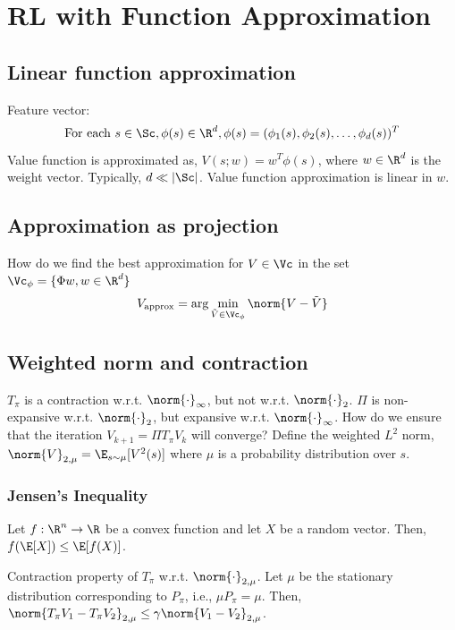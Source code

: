 \chapter{RL with Function Approximation}

\section{Linear function approximation}
Feature vector:
\[
    \text{For each } s \in\Sc, \phi(s) \in \R^d, \phi(s) = (\phi_1(s), \phi_2(s), \dots, \phi_d(s))^T
\]
Value function is approximated as, $V(s; w) = w^T \phi(s)$, where $w \in \R^d$ is the weight vector. Typically, $d \ll |\Sc|$. Value function approximation is linear in $w$.

\section{Approximation as projection}
How do we find the best approximation for $V \in \Vc$ in the set $\Vc_\phi = \{\Phi w, w \in \R^d \}$
\[
    V_{\text{approx}} = \arg\min_{\tilde{V}\in\Vc_\phi} \norm{V - \tilde{V}}
\]
\section{Weighted norm and contraction}
$T_\pi$ is a contraction w.r.t. $\norm{\cdot}_\infty$, but not w.r.t. $\norm{\cdot}_2$. $\Pi$ is non-expansive w.r.t. $\norm{\cdot}_2$, but expansive w.r.t. $\norm{\cdot}_\infty$.
How do we ensure that the iteration $V_{k+1} = \Pi T_\pi V_k$ will converge? Define the weighted $L^2$ norm, $\norm{V}_{2,\mu} = \E_{s\sim\mu}[V^2(s)]$ where $\mu$ is a probability distribution over $s$.

\subsection{Jensen's Inequality}
Let $f : \R^n \to \R$ be a convex function and let $X$ be a random vector. Then, $f(\E[X]) \leq \E[f(X)]$.

\begin{lemma}
    Contraction property of $T_\pi$ w.r.t. $\norm{\cdot}_{2,\mu}$. Let $\mu$ be the stationary distribution corresponding to $P_\pi$, i.e., $\mu P_\pi = \mu$. Then,
    $\norm{T_\pi V_1 - T_\pi V_2}_{2, \mu} \leq \gamma \norm{V_1 - V_2}_{2, \mu}$.
\end{lemma}

